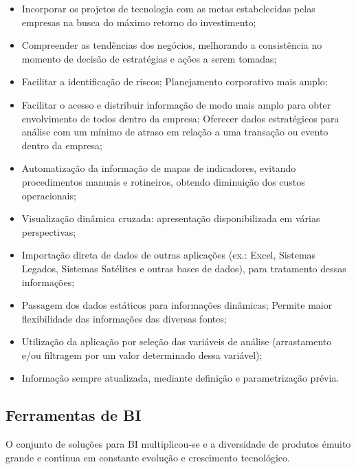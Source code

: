\begin{itemize}

    \item Incorporar os projetos de tecnologia com as metas estabelecidas pelas empresas na busca do m\'{a}ximo retorno do investimento;
    \item Compreender as tendências dos neg\'{o}cios, melhorando a consistência no momento de decis\~{a}o de estrat\'{e}gias e a\c{c}\~{o}es a serem tomadas;
    \item Facilitar a identifica\c{c}\~{a}o de riscos;
    Planejamento corporativo mais amplo;
    \item Facilitar o acesso e distribuir informa\c{c}\~{a}o de modo mais amplo para obter envolvimento de todos dentro da empresa;
    Oferecer dados estrat\'{e}gicos para an\'{a}lise com um m\'{i}nimo de atraso em rela\c{c}\~{a}o a uma transa\c{c}\~{a}o ou evento dentro da empresa;
    \item Automatiza\c{c}\~{a}o da informa\c{c}\~{a}o de mapas de indicadores, evitando procedimentos manuais e rotineiros, obtendo diminui\c{c}\~{a}o dos custos operacionais;
    \item Visualiza\c{c}\~{a}o dinâmica cruzada: apresenta\c{c}\~{a}o disponibilizada em v\'{a}rias perspectivas;
    \item Importa\c{c}\~{a}o direta de dados de outras aplica\c{c}\~{o}es (ex.: Excel, Sistemas Legados, Sistemas Sat\'{e}lites e outras bases de dados), para tratamento dessas informa\c{c}\~{o}es;
    \item Passagem dos dados est\'{a}ticos para informa\c{c}\~{o}es dinâmicas;
    Permite maior flexibilidade das informa\c{c}\~{o}es das diversas fontes;
    \item Utiliza\c{c}\~{a}o da aplica\c{c}\~{a}o por sele\c{c}\~{a}o das vari\'{a}veis de an\'{a}lise (arrastamento e/ou filtragem por um valor determinado dessa vari\'{a}vel);
    \item Informa\c{c}\~{a}o sempre atualizada, mediante defini\c{c}\~{a}o e parametriza\c{c}\~{a}o pr\'{e}via.
 
 \end{itemize}
 
\subsection{Ferramentas de BI}

O conjunto de solu\c{c}\~{o}es para BI multiplicou-se e a diversidade de produtos \'{e}muito grande e continua em constante evolu\c{c}\~{a}o e crescimento tecnol\'{o}gico.

